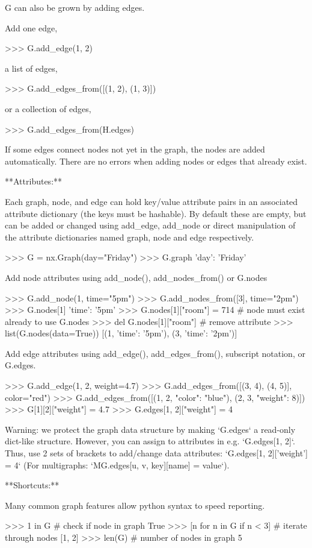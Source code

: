 \begin{DoxyVerb}
G can also be grown by adding edges.

Add one edge,

>>> G.add_edge(1, 2)

a list of edges,

>>> G.add_edges_from([(1, 2), (1, 3)])

or a collection of edges,

>>> G.add_edges_from(H.edges)

If some edges connect nodes not yet in the graph, the nodes
are added automatically.  There are no errors when adding
nodes or edges that already exist.

**Attributes:**

Each graph, node, and edge can hold key/value attribute pairs
in an associated attribute dictionary (the keys must be hashable).
By default these are empty, but can be added or changed using
add_edge, add_node or direct manipulation of the attribute
dictionaries named graph, node and edge respectively.

>>> G = nx.Graph(day="Friday")
>>> G.graph
{'day': 'Friday'}

Add node attributes using add_node(), add_nodes_from() or G.nodes

>>> G.add_node(1, time="5pm")
>>> G.add_nodes_from([3], time="2pm")
>>> G.nodes[1]
{'time': '5pm'}
>>> G.nodes[1]["room"] = 714  # node must exist already to use G.nodes
>>> del G.nodes[1]["room"]  # remove attribute
>>> list(G.nodes(data=True))
[(1, {'time': '5pm'}), (3, {'time': '2pm'})]

Add edge attributes using add_edge(), add_edges_from(), subscript
notation, or G.edges.

>>> G.add_edge(1, 2, weight=4.7)
>>> G.add_edges_from([(3, 4), (4, 5)], color="red")
>>> G.add_edges_from([(1, 2, {"color": "blue"}), (2, 3, {"weight": 8})])
>>> G[1][2]["weight"] = 4.7
>>> G.edges[1, 2]["weight"] = 4

Warning: we protect the graph data structure by making `G.edges` a
read-only dict-like structure. However, you can assign to attributes
in e.g. `G.edges[1, 2]`. Thus, use 2 sets of brackets to add/change
data attributes: `G.edges[1, 2]['weight'] = 4`
(For multigraphs: `MG.edges[u, v, key][name] = value`).

**Shortcuts:**

Many common graph features allow python syntax to speed reporting.

>>> 1 in G  # check if node in graph
True
>>> [n for n in G if n < 3]  # iterate through nodes
[1, 2]
>>> len(G)  # number of nodes in graph
5


\end{DoxyVerb}
